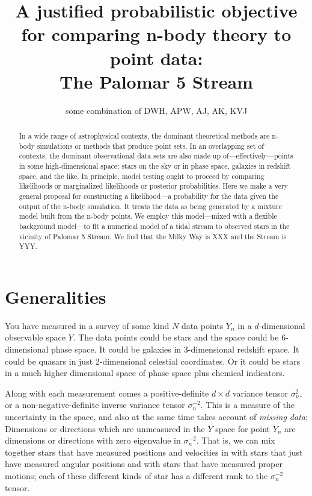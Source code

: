 \documentclass[12pt,pdftex,preprint]{aastex}
\begin{document}
\title{A justified probabilistic objective \\ for comparing n-body theory to point data: \\ The Palomar 5 Stream}
\author{some combination of DWH, APW, AJ, AK, KVJ}

\begin{abstract}
In a wide range of astrophysical contexts, the dominant theoretical
methods are n-body simulations or methods that produce point sets.  In
an overlapping set of contexts, the dominant observational data sets
are also made up of---effectively---points in some high-dimensional
space: stars on the sky or in phase space, galaxies in redshift space,
and the like.  In principle, model testing ought to proceed by
comparing likelihoods or marginalized likelihoods or posterior
probabilities.  Here we make a very general proposal for constructing
a likelihood---a probability for the data given the output of the
n-body simulation.  It treats the data as being generated by a mixture
model built from the n-body points.  We employ this model---mixed with
a flexible background model---to fit a numerical model of a tidal
stream to observed stars in the vicinity of Palomar 5 Stream.  We find
that the Milky Way is XXX and the Stream is YYY.
\end{abstract}

\section{Generalities}

You have measured in a survey of some kind $N$ data points $Y_n$ in a
$d$-dimensional observable space $Y$.  The data points could be stars
and the space could be 6-dimensional phase space.  It could be
galaxies in 3-dimensional redshift space.  It could be quasars in just
2-dimensional celestial coordinates.  Or it could be stars in a much
higher dimensional space of phase space plus chemical indicators.

Along with each measurement comes a positive-definite $d\times d$
variance tensor $\sigma^2_n$, or a non-negative-definite inverse
variance tensor $\sigma^{-2}_n$.  This is a measure of the uncertainty
in the space, and also at the same time takes account of \emph{missing
  data}: Dimensions or directions which are unmeasured in the $Y$
space for point $Y_n$ are dimensions or directions with zero
eigenvalue in $\sigma^{-2}_n$.  That is, we can mix together stars
that have measured positions and velocities in with stars that just
have measured angular positions and with stars that have measured
proper motions; each of these different kinds of star has a different
rank to the $\sigma^{-2}_n$ tensor.
\end{document}
